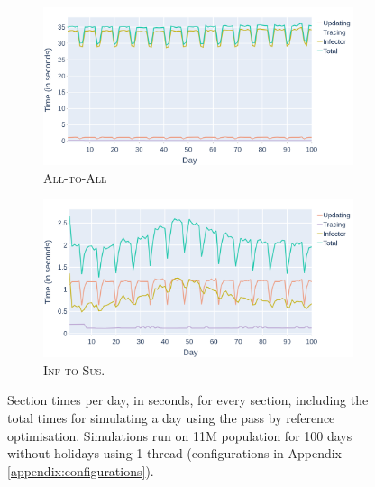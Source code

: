 \begin{figure}
    \centering
    \begin{subfigure}[b]{\linewidth}
        \centering
        \includegraphics[width=\linewidth]{3 - Stride/fig/standard_all_runtime_sections.png}
        \caption{\textsc{All-to-All}}
        \label{fig:standard_all_sections}
    \end{subfigure}
    \begin{subfigure}[b]{\linewidth}
        \centering
        \includegraphics[width=\linewidth]{3 - Stride/fig/standard_opt_runtime_sections.png}
        \caption{\textsc{Inf-to-Sus}.}
        \label{fig:standard_opt_sections}
    \end{subfigure}
    \caption{Section times per day, in seconds, for every section, including the total times for simulating a day using the pass by reference optimisation. Simulations run on 11M population for 100 days without holidays using 1 thread (configurations in Appendix \ref{appendix:configurations}).}
    \label{fig:standard_sections}
\end{figure}

